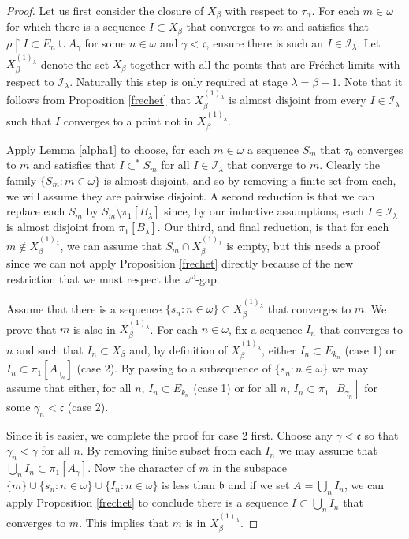 \documentclass{amsart}
\theoremstyle{definition}
\theoremstyle{remark}
\begin{document}
\begin{proof}
 Let us
 first consider the closure of $X_\beta$ with respect to
 $\tau_\alpha$. For each $m\in\omega$ for which there
 is a sequence $I\subset X_\beta$ that converges to
  $m$ and satisfies that $\rho\restriction I \subset E_n\cup A_\gamma$
  for some $n\in\omega$ and $\gamma <\mathfrak c$, ensure
  there is such an $I\in \mathcal I_\lambda$. 
Let $ X_\beta^{(1)_\lambda}$ denote the set $ X_\beta$ together
with all the points that are   Fr\'echet limits with respect
to $\mathcal I_\lambda$. 
Naturally this step is only required at stage $\lambda = \beta+1$.
Note that it follows from 
Proposition \ref{frechet} that $X_\beta^{(1)_\lambda}$ is 
almost disjoint from every $I\in\mathcal I_\lambda$
such that $I$ converges to a point not in $X_\beta^{(1)_\lambda}$.

 
Apply Lemma \ref{alpha1} to choose, for each $m\in \omega$
a sequence $S_m$ that $\tau_0$ converges to $m$ and satisfies
that $I\subset^* S_m$ for all $I\in\mathcal I_\lambda$ that 
converge to $m$. Clearly the family $\{ S_m : m\in\omega\}$
is almost disjoint, and so by removing a finite set from
each, we will assume they are pairwise disjoint. 
A second reduction is that we can replace each $S_m$
by  $S_m\setminus \pi_1[B_\lambda]$ since, by our inductive
assumptions, each $I\in \mathcal I_\lambda$ is almost
disjoint from $\pi_1[B_\lambda]$. Our third, and final reduction,
is that for each $m\notin X_\beta^{(1)_\lambda}$,   
we can assume that $S_m\cap X_\beta^{(1)_\lambda}$ is empty, but
this needs a proof since we can not apply Proposition  \ref{frechet} directly
because of the new restriction that we must respect the $\omega^\omega$-gap.

Assume that there is a sequence $\{ s_n: n\in\omega\}
\subset X_{\beta}^{(1)_\lambda}$ that converges to $m$.
We prove that $m$ is also in $X_\beta^{(1)_\lambda}$.
For
each $n\in\omega$, fix a sequence $I_n$ that converges to
 $n$ and such that $I_n\subset X_\beta$ and, by definition
 of $X_\beta^{(1)_\lambda}$, 
 either $I_n\subset E_{k_n}$  (case 1) or   $I_n\subset \pi_1[A_{\gamma_n}]$ (case 2). 
 By passing to a subsequence of $\{ s_n : n\in\omega\}$ we may
 assume that either,   for all $n$, $I_n\subset E_{k_n}$ (case 1) or
   for all $n$, $I_n\subset \pi_1[B_{\gamma_n}]$ for some $\gamma_n <\mathfrak c$
   (case 2).

Since it is easier, we complete the proof for case 2 first.
Choose any $\gamma <\mathfrak c$ so that $\gamma_n <\gamma$ for all $n$.
 By removing  finite subset from each $I_n$ we may assume that
  $\bigcup_n I_n\subset \pi_1[A_\gamma]$. Now the character of $m$
  in the subspace $\{m\}\cup \{s_n :n\in\omega\}\cup \{ I_n : n\in\omega\}$
  is less than $\mathfrak b$ and if we set $A = \bigcup_n I_n$, we
  can apply Proposition \ref{frechet} to conclude there is a 
  sequence $I\subset \bigcup_n I_n$ that converges to $m$. This
  implies that $m$ is in $X_\beta^{(1)_\lambda}$. 


\end{proof}
\end{document}
